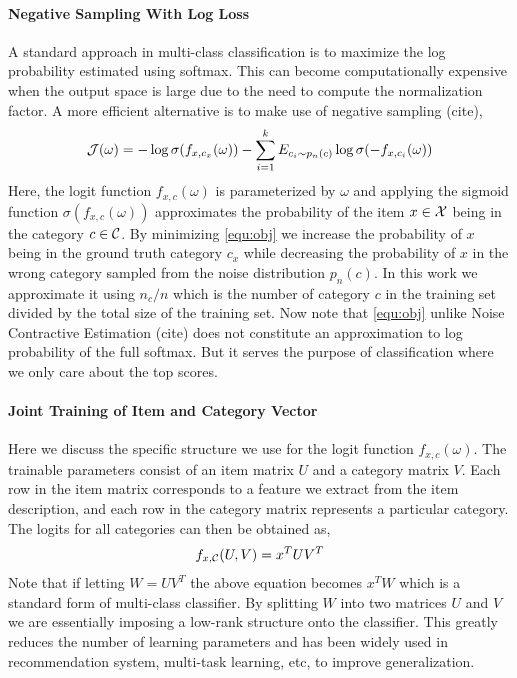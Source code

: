 \paragraph{Negative Sampling With Log Loss}
A standard approach in multi-class classification is to maximize the log probability estimated using softmax. This can become computationally expensive when the output space is large due to the need to compute the normalization factor. A more efficient alternative is to make use of negative sampling (cite),
\begin{align}
\label{equ:obj}
    \mathcal{J}(\omega) = 
    - \log \sigma(f_{x, c_x}(\omega)) 
    - \sum_{i=1}^k E_{c_i \sim p_n(c)} \log \sigma(-f_{x, c_i}(\omega))
\end{align}
Here, the logit function $f_{x, c}(\omega)$ is parameterized by $\omega$ and applying the sigmoid function $\sigma(f_{x, c}(\omega))$ approximates the probability of the item $x \in \mathcal{X}$ being in the category $c \in \mathcal{C}$. 
By minimizing \eqref{equ:obj} we increase the probability of $x$ being in the ground truth category $c_x$ while decreasing the probability of $x$ in the wrong category sampled from the noise distribution $p_n(c)$. In this work we approximate it using $n_c / n$ which is the number of category $c$ in the training set divided by the total size of the training set. Now note that \eqref{equ:obj} unlike Noise Contractive Estimation (cite) does not constitute an approximation to log probability of the full softmax. 
But it serves the purpose of classification where we only care about the top scores.

\paragraph{Joint Training of Item and Category Vector}
Here we discuss the specific structure we use for the logit function $f_{x, c}(\omega)$. The trainable parameters consist of an item matrix $U$ and a category matrix $V$. Each row in the item matrix corresponds to a feature we extract from the item description, and each row in the category matrix represents a particular category. The logits for all categories can then be obtained as,
\begin{align*}
    f_{x, \mathcal{C}}(U, V) = x^TUV^T
\end{align*}
Note that if letting $W = UV^T$ the above equation becomes $x^TW$ which is a standard form of multi-class classifier. By splitting $W$ into two matrices $U$ and $V$ we are essentially imposing a low-rank structure onto the classifier. This greatly reduces the number of learning parameters and has been widely used in recommendation system, multi-task learning, etc, to improve generalization.

